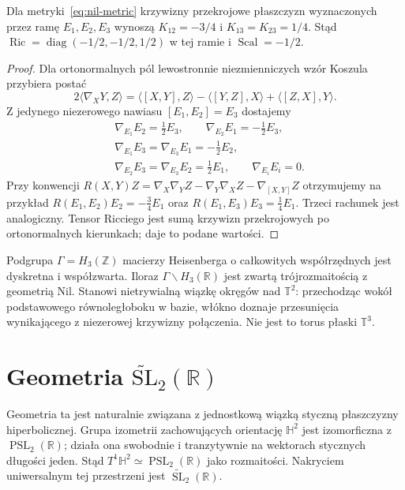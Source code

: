 \begin{twierdzenie}
Dla metryki~\eqref{eq:nil-metric} krzywizny przekrojowe płaszczyzn
wyznaczonych przez ramę $E_1,E_2,E_3$ wynoszą
$K_{12}=-3/4$ i $K_{13}=K_{23}=1/4$.
Stąd $\operatorname{Ric}=\operatorname{diag}(-1/2,-1/2,1/2)$
w tej ramie i $\operatorname{Scal}=-1/2$.
\end{twierdzenie}
\begin{proof}
Dla ortonormalnych pól lewostronnie niezmienniczych wzór Koszula
przybiera postać
\[
2\langle\nabla_XY,Z\rangle
=\langle[X,Y],Z\rangle-\langle[Y,Z],X\rangle
+\langle[Z,X],Y\rangle.
\]
Z jedynego niezerowego nawiasu $[E_1,E_2]=E_3$ dostajemy
\[
\begin{aligned}
&\nabla_{E_1}E_2=\tfrac12E_3,\qquad
 \nabla_{E_2}E_1=-\tfrac12E_3,\\
&\nabla_{E_1}E_3=\nabla_{E_3}E_1=-\tfrac12E_2,\\
&\nabla_{E_2}E_3=\nabla_{E_3}E_2=\tfrac12E_1,
\qquad \nabla_{E_i}E_i=0.
\end{aligned}
\]
Przy konwencji $R(X,Y)Z=\nabla_X\nabla_YZ-\nabla_Y\nabla_XZ-
\nabla_{[X,Y]}Z$ otrzymujemy na przykład
$R(E_1,E_2)E_2=-\tfrac34E_1$ oraz
$R(E_1,E_3)E_3=\tfrac14E_1$. Trzeci rachunek jest analogiczny.
Tensor Ricciego jest sumą krzywizn przekrojowych po ortonormalnych
kierunkach; daje to podane wartości.
\end{proof}

\begin{przyklad}
Podgrupa $\Gamma=H_3(\mathbb Z)$ macierzy Heisenberga o całkowitych
współrzędnych jest dyskretna i współzwarta. Iloraz
$\Gamma\backslash H_3(\mathbb R)$ jest zwartą trójrozmaitością
z geometrią Nil. Stanowi nietrywialną wiązkę okręgów nad
$\mathbb T^2$: przechodząc wokół podstawowego równoległoboku w bazie,
włókno doznaje przesunięcia wynikającego z niezerowej krzywizny
połączenia. Nie jest to torus płaski $\mathbb T^3$.
\end{przyklad}

\section{Geometria \texorpdfstring{$\widetilde{\mathrm{SL}}_2(\mathbb R)$}{SL2-tylda}}
\label{sec:thurston-sl2}

Geometria ta jest naturalnie związana z jednostkową wiązką styczną
płaszczyzny hiperbolicznej. Grupa izometrii zachowujących orientację
$\mathbb H^2$ jest izomorficzna z
$\operatorname{PSL}_2(\mathbb R)$; działa ona swobodnie i tranzytywnie
na wektorach stycznych długości jeden. Stąd
$T^1\mathbb H^2\simeq\operatorname{PSL}_2(\mathbb R)$ jako rozmaitości.
Nakryciem uniwersalnym tej przestrzeni jest
$\widetilde{\operatorname{SL}}_2(\mathbb R)$.

